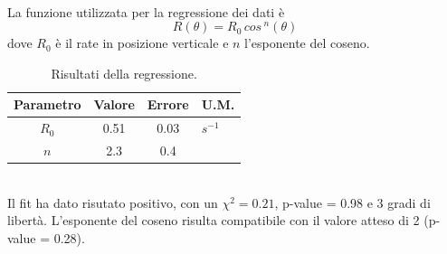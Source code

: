 \documentclass[11pt]{article} %
\begin{document}
\\La funzione utilizzata per la regressione dei dati è
\begin{equation}
R\left(\theta\right)=R_{0}\,cos\,^{n}\left(\theta\right)
\end{equation}
dove $R_0$ è il rate in posizione verticale e $n$ l'esponente del coseno.
\begin{table}[!h]
\begin{center}
\begin{tabular}{|c|c|c|l|}
\hline
\multicolumn{1}{|l|}{Parametro} & \multicolumn{1}{l|}{Valore} & \multicolumn{1}{l|}{Errore} & U.M. \\ \hline
$R_0$                               & 0.51                       & 0.03                       &    $s^{-1}$  \\ \hline
$n$                               & 2.3                       & 0.4                           &    \\ \hline
\end{tabular}
\end{center}
\caption{Risultati della regressione.}
\end{table}
\\Il fit ha dato risutato positivo, con un $\chi ^2 = 0.21$, p-value = 0.98 e 3 gradi di libertà. L'esponente del coseno risulta compatibile con il valore atteso di 2 (p-value = 0.28). 
\end{document}

